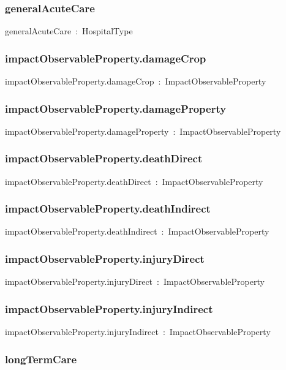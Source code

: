 \documentclass{article}
\begin{document}
\subsubsection*{generalAcuteCare}

generalAcuteCare~:~HospitalType

\subsubsection*{impactObservableProperty.damageCrop}

impactObservableProperty.damageCrop~:~ImpactObservableProperty

\subsubsection*{impactObservableProperty.damageProperty}

impactObservableProperty.damageProperty~:~ImpactObservableProperty

\subsubsection*{impactObservableProperty.deathDirect}

impactObservableProperty.deathDirect~:~ImpactObservableProperty

\subsubsection*{impactObservableProperty.deathIndirect}

impactObservableProperty.deathIndirect~:~ImpactObservableProperty

\subsubsection*{impactObservableProperty.injuryDirect}

impactObservableProperty.injuryDirect~:~ImpactObservableProperty

\subsubsection*{impactObservableProperty.injuryIndirect}

impactObservableProperty.injuryIndirect~:~ImpactObservableProperty

\subsubsection*{longTermCare}
\end{document}
